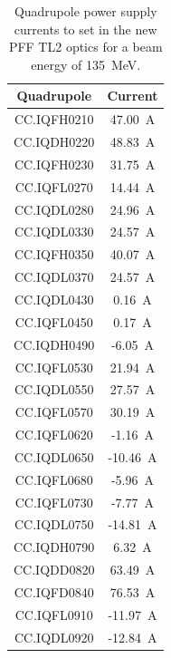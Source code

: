 \begin{table}
  \begin{center}
    \begin{tabular}{|c c|}
	    \hline
        Quadrupole & Current \\ \hline
		CC.IQFH0210 &	47.00~A \\
		CC.IQDH0220 &	48.83~A \\
		CC.IQFH0230 &	31.75~A \\
		CC.IQFL0270 &	14.44~A \\
		CC.IQDL0280 &	24.96~A \\
		CC.IQDL0330 &	24.57~A \\
		CC.IQFH0350 &	40.07~A \\
		CC.IQDL0370 &	24.57~A \\
		CC.IQDL0430 &	0.16~A \\
		CC.IQFL0450 &	0.17~A \\
		CC.IQDH0490 &	-6.05~A \\
		CC.IQFL0530 &	21.94~A \\
		CC.IQDL0550 &	27.57~A \\
		CC.IQFL0570 &	30.19~A \\
		CC.IQFL0620 &	-1.16~A \\
		CC.IQDL0650 &	-10.46~A \\
		CC.IQFL0680 &	-5.96~A \\
		CC.IQFL0730 &	-7.77~A \\
		CC.IQDL0750 &	-14.81~A \\
		CC.IQDH0790 &	6.32~A \\
		CC.IQDD0820 &	63.49~A \\
		CC.IQFD0840 &	76.53~A \\
		CC.IQFL0910 &	-11.97~A \\
		CC.IQDL0920 &	-12.84~A \\
	   \hline
    \end{tabular}
    \caption{Quadrupole power supply currents to set in the new PFF TL2 optics for a beam energy of 135~MeV.}
  	\label{t:pffOpticsQuads}
  \end{center}


\end{table}
